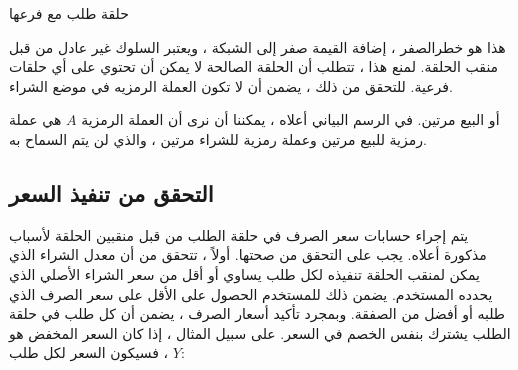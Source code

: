 \documentclass[12pt, a4paper, leqno]{report}
\makeatletter
\newenvironment{figurehere}
 {\def\@captype{figure}}
 {}
\theoremstyle{plain}
\theoremstyle{definition}
\makeatother
\begin{document}
\begin{multicols}{2}
\begin{otherlanguage}{arabic}
\begin{center}
\begin{figurehere}

\caption{حلقة طلب مع فرعها}
\label{fig:subring}
\end{figurehere}
\end{center}

هذا هو خطرالصفر ، إضافة القيمة صفر إلى الشبكة ، ويعتبر السلوك غير عادل من قبل منقب الحلقة. لمنع هذا ، تتطلب  أن الحلقة الصالحة لا يمكن أن تحتوي على أي حلقات فرعية. للتحقق من ذلك ، يضمن  أن لا تكون العملة الرمزيه في موضع الشراء.

أو البيع مرتين. في الرسم البياني أعلاه ، يمكننا أن نرى أن العملة الرمزية $A$ هي عملة رمزية للبيع مرتين وعملة رمزية للشراء مرتين ، والذي لن يتم السماح به.

\subsection{التحقق من تنفيذ السعر}
يتم إجراء حسابات سعر الصرف في حلقة الطلب من قبل منقبين الحلقة لأسباب مذكورة أعلاه. يجب على  التحقق من صحتها. أولاً ، تتحقق من أن معدل الشراء الذي يمكن لمنقب الحلقة تنفيذه لكل طلب يساوي أو أقل من سعر الشراء الأصلي الذي يحدده المستخدم. يضمن ذلك للمستخدم الحصول على الأقل على سعر الصرف الذي طلبه أو أفضل من الصفقة. وبمجرد تأكيد أسعار الصرف ، يضمن  أن كل طلب في حلقة الطلب يشترك بنفس الخصم في السعر. على سبيل المثال ، إذا كان السعر المخفض هو $Y$ ، فسيكون السعر لكل طلب:


\end{otherlanguage}
\end{multicols}
\end{document}
